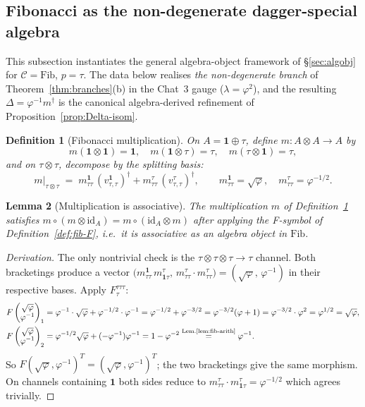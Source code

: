 \documentclass[11pt,a4paper]{article}
\newtheorem{definition}{Definition}[section]
\newtheorem{lemma}[definition]{Lemma}
\theoremstyle{definition}
\newcommand{\Cc}{\mathcal{C}}
\newcommand{\id}{\mathrm{id}}
\newcommand{\Fib}{\mathrm{Fib}}
\newcommand{\one}{\mathbf{1}}
\begin{document}
\subsection{Fibonacci as the non-degenerate dagger-special algebra}\label{sec:fib-algebra}

This subsection instantiates the general algebra-object framework of
\S\ref{sec:algobj} for $\Cc = \Fib$, $p = \tau$. The data below realises
\emph{the non-degenerate branch} of Theorem~\ref{thm:branches}(b) in the
Chat~3 gauge ($\lambda = \varphi^{2}$), and the resulting
$\Delta = \varphi^{-1}m^{\dagger}$ is the canonical
algebra-derived refinement of Proposition~\ref{prop:Delta-isom}.

\begin{definition}[Fibonacci multiplication]\label{def:fib-mult}
On $A = \one\oplus\tau$, define $m:A\otimes A\to A$ by
\[
m(\one\otimes\one)=\one,\quad
m(\one\otimes\tau)=\tau,\quad
m(\tau\otimes\one)=\tau,
\]
and on $\tau\otimes\tau$, decompose by the splitting basis:
\[
m\big|_{\tau\otimes\tau}
\;=\;
m^{\one}_{\tau\tau}\,(v^{\one}_{\tau,\tau})^{\dagger}
+ m^{\tau}_{\tau\tau}\,(v^{\tau}_{\tau,\tau})^{\dagger},
\qquad
m^{\one}_{\tau\tau} = \sqrt{\varphi},\quad m^{\tau}_{\tau\tau} = \varphi^{-1/2}.
\]
\end{definition}

\begin{lemma}[Multiplication is associative]\label{lem:fib-assoc}
The multiplication $m$ of Definition~\ref{def:fib-mult} satisfies
$m\circ(m\otimes\id_A) = m\circ(\id_A\otimes m)$ after applying the F-symbol
of Definition~\ref{def:fib-F}, i.e.\ it is associative as an algebra
object in $\Fib$.
\end{lemma}
\begin{proof}[Derivation]
The only nontrivial check is the $\tau\otimes\tau\otimes\tau\to\tau$ channel.
Both bracketings produce a vector $\bigl(m^{\one}_{\tau\tau}\,m^\tau_{\one\tau},\,
m^{\tau}_{\tau\tau}\cdot m^\tau_{\tau\tau}\bigr) = (\sqrt\varphi,\,\varphi^{-1})$
in their respective bases. Apply $F^{\tau\tau\tau}_\tau$:
\begin{align*}
F\begin{pmatrix}\sqrt\varphi\\ \varphi^{-1}\end{pmatrix}_{1}
&= \varphi^{-1}\cdot\sqrt\varphi + \varphi^{-1/2}\cdot\varphi^{-1}
= \varphi^{-1/2}+\varphi^{-3/2}
= \varphi^{-3/2}(\varphi+1)
= \varphi^{-3/2}\cdot\varphi^{2}
= \varphi^{1/2} = \sqrt\varphi,\\
F\begin{pmatrix}\sqrt\varphi\\ \varphi^{-1}\end{pmatrix}_{2}
&= \varphi^{-1/2}\sqrt\varphi + (-\varphi^{-1})\varphi^{-1}
= 1 - \varphi^{-2}
\stackrel{\text{Lem.\ref{lem:fib-arith}}}{=} \varphi^{-1}.
\end{align*}
So $F(\sqrt\varphi,\varphi^{-1})^{T} = (\sqrt\varphi,\varphi^{-1})^{T}$; the
two bracketings give the same morphism. On channels containing $\one$ both
sides reduce to $m^\tau_{\tau\tau}\cdot m^\tau_{\one\tau} = \varphi^{-1/2}$ which agrees
trivially.
\end{proof}
\end{document}
